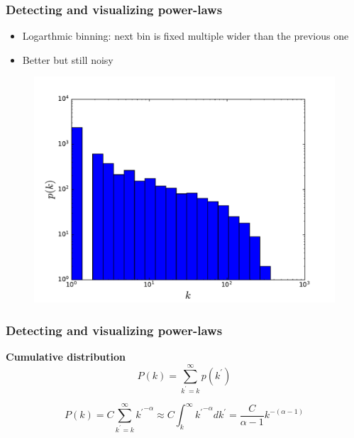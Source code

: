 \documentclass{beamer}
\begin{document}
\begin{frame}
    \frametitle{Detecting and visualizing power-laws}
    \centering
    \begin{itemize}
    \setlength\itemsep{1em}
        \item{Logarthmic binning: next bin is fixed multiple wider than the previous one}
        \item{Better but still noisy}
    \end{itemize}

\begin{figure}
    \begin{center}
        \includegraphics[width=0.8\columnwidth]{deg_distri_global_airport_log_logbins.pdf}
        \caption{\label{}}
    \end{center}
\end{figure}

    
\end{frame}
\begin{frame}
    \frametitle{Detecting and visualizing power-laws}
    \centering
    {\bf Cumulative distribution}
    $$P(k) = \sum\limits_{k^{\prime} = k}^\infty p(k^{\prime})$$

    $$P(k) = C\sum\limits_{k^{\prime} = k}^\infty {k^{\prime}}^{-\alpha} \approx C\int_k^\infty {k^{\prime}}^{-\alpha}dk^{\prime} = \frac{C}{\alpha-1}k^{-(\alpha-1)}$$
\end{frame}
\end{document}
